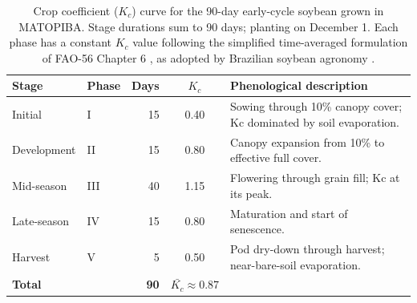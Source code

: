 \begin{table}[t]
\centering
\caption{Crop coefficient (\(K_c\)) curve for the 90-day early-cycle soybean grown in MATOPIBA. Stage durations sum to 90 days; planting on December 1. Each phase has a constant \(K_c\) value following the simplified time-averaged formulation of FAO-56 Chapter 6 \citep{Allen1998}, as adopted by Brazilian soybean agronomy \citep{EmbrapaSoja, Steduto2012}.}
\label{tab:kc-soybean-5stage}
\begin{tabular}{llrcl}
\toprule
Stage & Phase & Days & \(K_c\) & Phenological description \\
\midrule
Initial & I & 15 & 0.40 & Sowing through 10\% canopy cover; Kc dominated by soil evaporation. \\
Development & II & 15 & 0.80 & Canopy expansion from 10\% to effective full cover. \\
Mid-season & III & 40 & 1.15 & Flowering through grain fill; Kc at its peak. \\
Late-season & IV & 15 & 0.80 & Maturation and start of senescence. \\
Harvest & V & 5 & 0.50 & Pod dry-down through harvest; near-bare-soil evaporation. \\
\midrule
\textbf{Total} & & \textbf{90} & \(\bar{K_c} \approx 0.87\) & \\
\bottomrule
\end{tabular}
\end{table}